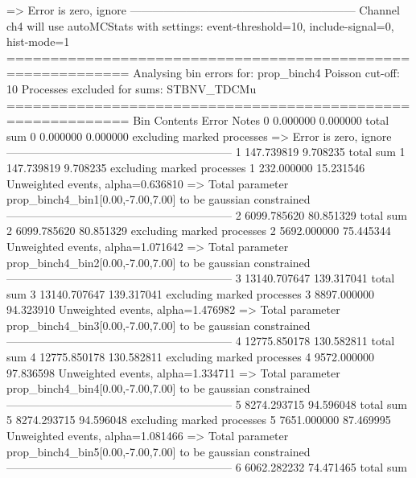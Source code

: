   => Error is zero, ignore      
------------------------------------------------------------
Channel ch4 will use autoMCStats with settings: event-threshold=10, include-signal=0, hist-mode=1
============================================================
Analysing bin errors for: prop_binch4
Poisson cut-off: 10
Processes excluded for sums: STBNV_TDCMu
============================================================
Bin        Contents        Error           Notes                         
0          0.000000        0.000000        total sum                     
0          0.000000        0.000000        excluding marked processes    
  => Error is zero, ignore      
------------------------------------------------------------
1          147.739819      9.708235        total sum                     
1          147.739819      9.708235        excluding marked processes    
1          232.000000      15.231546       Unweighted events, alpha=0.636810
  => Total parameter prop_binch4_bin1[0.00,-7.00,7.00] to be gaussian constrained
------------------------------------------------------------
2          6099.785620     80.851329       total sum                     
2          6099.785620     80.851329       excluding marked processes    
2          5692.000000     75.445344       Unweighted events, alpha=1.071642
  => Total parameter prop_binch4_bin2[0.00,-7.00,7.00] to be gaussian constrained
------------------------------------------------------------
3          13140.707647    139.317041      total sum                     
3          13140.707647    139.317041      excluding marked processes    
3          8897.000000     94.323910       Unweighted events, alpha=1.476982
  => Total parameter prop_binch4_bin3[0.00,-7.00,7.00] to be gaussian constrained
------------------------------------------------------------
4          12775.850178    130.582811      total sum                     
4          12775.850178    130.582811      excluding marked processes    
4          9572.000000     97.836598       Unweighted events, alpha=1.334711
  => Total parameter prop_binch4_bin4[0.00,-7.00,7.00] to be gaussian constrained
------------------------------------------------------------
5          8274.293715     94.596048       total sum                     
5          8274.293715     94.596048       excluding marked processes    
5          7651.000000     87.469995       Unweighted events, alpha=1.081466
  => Total parameter prop_binch4_bin5[0.00,-7.00,7.00] to be gaussian constrained
------------------------------------------------------------
6          6062.282232     74.471465       total sum                     
